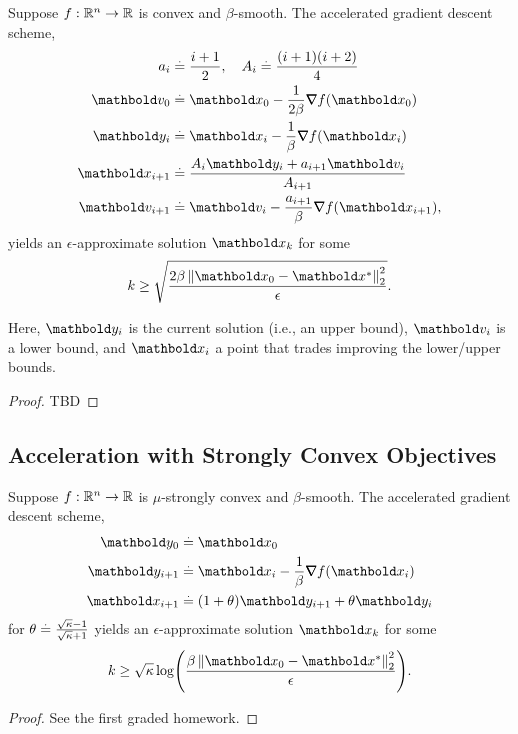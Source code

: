 \begin{thm} Suppose $f: \mathbb{R}^n \to \mathbb{R}$ is convex and $\beta$-smooth. The accelerated gradient descent scheme, \begin{align}\begin{split}
    a_i &\defeq \frac{i+1}{2}, \quad A_i \defeq \frac{(i+1)(i+2)}{4} \\
    \vv_0 &\defeq \vx_0 - \frac{1}{2\beta} \grad f(\vx_0) \\
    \vy_i &\defeq \vx_i - \frac{1}{\beta} \grad f(\vx_i) \\
    \vx_{i+1} &\defeq \frac{A_i\vy_i + a_{i+1}\vv_i}{A_{i+1}} \\
    \vv_{i+1} &\defeq \vv_i - \frac{a_{i+1}}{\beta} \grad f(\vx_{i+1}),
\end{split}\end{align} yields an $\epsilon$-approximate solution $\vx_k$ for some \begin{align*}
    k \geq \sqrt{\frac{2\beta\norm{\vx_0 - \s{\vx}}_2^2}{\epsilon}}.
\end{align*}
\end{thm} Here, $\vy_i$ is the current solution (i.e., an upper bound), $\vv_i$ is a lower bound, and $\vx_i$ a point that trades improving the lower/upper bounds.

\begin{proof}
TBD
\end{proof}

\subsection{Acceleration with Strongly Convex Objectives}

\begin{thm} Suppose $f: \mathbb{R}^n \to \mathbb{R}$ is $\mu$-strongly convex and $\beta$-smooth. The accelerated gradient descent scheme, \begin{align}\begin{split}
    \vy_0 &\defeq \vx_0 \\
    \vy_{i+1} &\defeq \vx_i - \frac{1}{\beta} \grad f(\vx_i) \\
    \vx_{i+1} &\defeq (1+\theta)\vy_{i+1} + \theta\vy_i
\end{split}\end{align} for $\theta \overset{.}{=} \frac{\sqrt{\kappa} - 1}{\sqrt{\kappa} + 1}$ yields an $\epsilon$-approximate solution $\vx_k$ for some \begin{align*}
    k \geq \sqrt{\kappa}\log\parentheses*{\frac{\beta\norm{\vx_0 - \s{\vx}}_2^2}{\epsilon}}.
\end{align*}
\end{thm}
\begin{proof}
See the first graded homework.
\end{proof}
